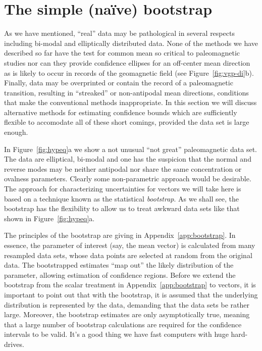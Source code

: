 \section{The simple (na\"ive) bootstrap}

As we have mentioned,  ``real'' data may  be pathological in several respects including  bi-modal and elliptically distributed data.   None of the methods we have described so far  have the  test for common mean so critical to paleomagnetic studies nor can they provide confidence ellipses for  an off-center mean direction
  as  is likely to occur in records of the geomagnetic field (see Figure~\ref{fig:vgp-di}b).  Finally, data may be overprinted or contain the record of a paleomagnetic transition, resulting in ``streaked'' or non-antipodal mean directions, conditions that make the conventional methods inappropriate.    In this section we will discuss alternative methods for estimating confidence bounds which are sufficiently flexible to accomodate all of these short comings, provided the data set is large enough.  

In Figure~\ref{fig:hypeq}a we show a not unusual ``not great'' paleomagnetic data set.  The data are   elliptical, bi-modal and one has the suspicion that the normal and reverse modes may be neither antipodal nor share the same concentration or ovalness parameters.  Clearly some non-parametric approach would be desirable.  
The  approach for   characterizing uncertainties for vectors we will take here is based on a technique known as the statistical 
{\it bootstrap}.  As we shall see, the bootstrap has the flexibility to allow us to treat awkward data sets like that shown in Figure~\ref{fig:hypeq}a.  

The principles of the bootstrap  are giving in Appendix~\ref{app:bootstrap}.  In essence, the parameter of interest (say, the mean vector) is calculated from many resampled data sets, whose data points are selected at random from  the original data.   The bootstrapped estimates ``map out'' the likely distribution of the parameter, allowing estimation of confidence regions.   Before we extend the bootstrap from the scalar treatment in Appendix~\ref{app:bootstrap}  to vectors, it is important to point out that  with the bootstrap, it is assumed that the underlying distribution is
represented by the data, demanding that the data sets be rather
large.   Moreover, the bootstrap estimates are only asymptotically
true, meaning that a large number of bootstrap calculations are required
for the confidence intervals to be valid.    It's a good thing we have fast computers with huge hard-drives.


